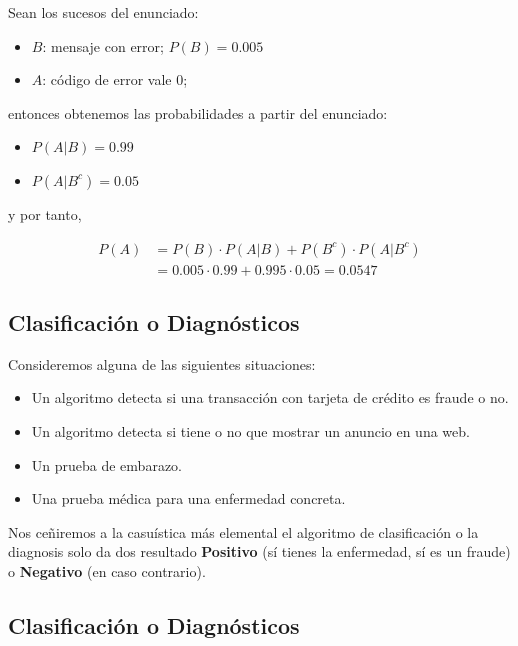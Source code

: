 \documentclass[]{book}
\providecommand{\tightlist}{%
  \setlength{\itemsep}{0pt}\setlength{\parskip}{0pt}}
\begin{document}
Sean los sucesos del enunciado:

\begin{itemize}
\tightlist
\item
  \(B\): mensaje con error; \(P(B)=0.005\)
\item
  \(A\): código de error vale 0;
\end{itemize}

entonces obtenemos las probabilidades a partir del enunciado:

\begin{itemize}
\tightlist
\item
  \(P(A|B)=0.99\)
\item
  \(P(A|B^c)= 0.05\)
\end{itemize}

y por tanto,

\[
\begin{array}{rl}
P(A) & =P(B)\cdot P(A|B)+P(B^c)\cdot P(A|B^c)\\ &
=0.005\cdot 0.99+0.995\cdot 0.05=0.0547\end{array}
\]

\hypertarget{clasificaciuxf3n-o-diagnuxf3sticos}{%
\subsection{Clasificación o Diagnósticos}\label{clasificaciuxf3n-o-diagnuxf3sticos}}

Consideremos alguna de las siguientes situaciones:

\begin{itemize}
\tightlist
\item
  Un algoritmo detecta si una transacción con tarjeta de crédito es fraude o no.
\item
  Un algoritmo detecta si tiene o no que mostrar un anuncio en una web.
\item
  Un prueba de embarazo.
\item
  Una prueba médica para una enfermedad concreta.
\end{itemize}

Nos ceñiremos a la casuística más elemental el algoritmo de clasificación o la diagnosis solo da dos resultado \textbf{Positivo} (sí tienes la enfermedad, sí es un fraude) o \textbf{Negativo} (en caso contrario).

\hypertarget{clasificaciuxf3n-o-diagnuxf3sticos-1}{%
\subsection{Clasificación o Diagnósticos}\label{clasificaciuxf3n-o-diagnuxf3sticos-1}}
\end{document}
